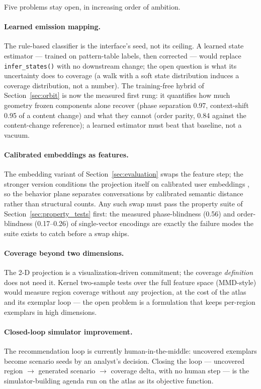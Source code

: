 Five problems stay open, in increasing order of ambition.

\paragraph{Learned emission mapping.}
The rule-based classifier is the interface's seed, not its ceiling.
A learned state estimator --- trained on pattern-table labels, then corrected --- would
replace \texttt{infer\_states()} with no downstream change; the open question is what its
uncertainty does to coverage (a walk with a soft state distribution induces a coverage
distribution, not a number).
The training-free hybrid of Section~\ref{sec:orbit} is now the measured first rung: it
quantifies how much geometry frozen components alone recover (phase separation 0.97,
context-shift 0.95 of a content change) and what they cannot (order parity, 0.84 against
the content-change reference); a learned estimator must beat that baseline, not a vacuum.

\paragraph{Calibrated embeddings as features.}
The embedding variant of Section~\ref{sec:evaluation} swaps the feature step; the stronger
version conditions the projection itself on calibrated user embeddings \citep{cue2026}, so
the behavior plane separates conversations by calibrated semantic distance rather than
structural counts.
Any such swap must pass the property suite of Section~\ref{sec:property_tests} first:
the measured phase-blindness (0.56) and order-blindness (0.17--0.26) of single-vector
encodings are exactly the failure modes the suite exists to catch before a swap ships.

\paragraph{Coverage beyond two dimensions.}
The 2-D projection is a visualization-driven commitment; the coverage \emph{definition} does
not need it.
Kernel two-sample tests over the full feature space (MMD-style) would measure region coverage
without any projection, at the cost of the atlas and its exemplar loop --- the open problem
is a formulation that keeps per-region exemplars in high dimensions.

\paragraph{Closed-loop simulator improvement.}
The recommendation loop is currently human-in-the-middle: uncovered exemplars become scenario
seeds by an analyst's decision.
Closing the loop --- uncovered region $\to$ generated scenario $\to$ coverage delta, with no
human step --- is the simulator-building agenda \citep{cue2026,distributionalGap2026} run on
the atlas as its objective function.

